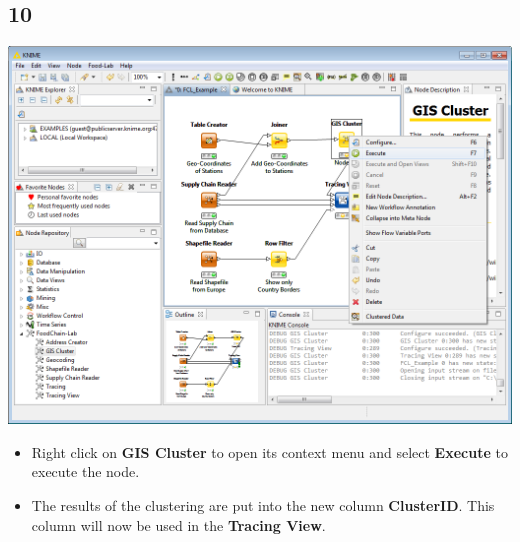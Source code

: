 \documentclass{beamer}
\begin{document}
\subsection{10}
\begin{frame}
	\begin{center}
  		\includegraphics[height=0.6\textheight]{10.png}
	\end{center}
	\begin{itemize}
		\item Right click on \textbf{GIS Cluster} to open its context menu and select \textbf{Execute} to execute the node.
		\item The results of the clustering are put into the new column \textbf{ClusterID}. This column will now be used in the \textbf{Tracing View}.
	\end{itemize}
\end{frame}
\end{document}
